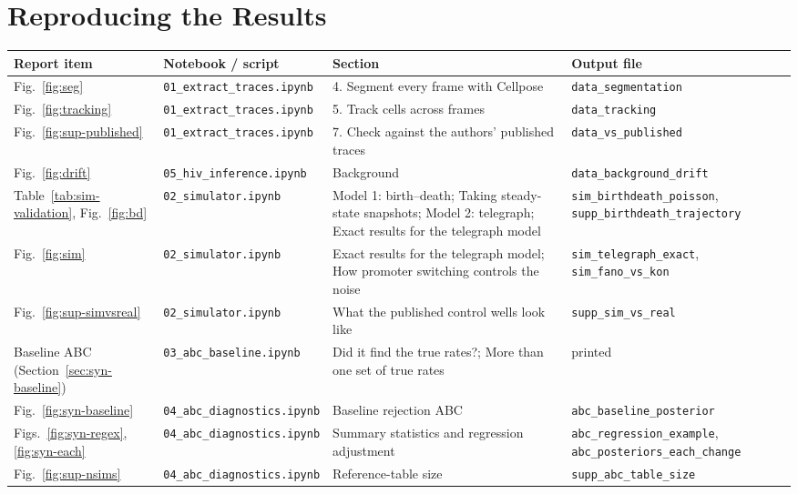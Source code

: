 \chapter{Reproducing the Results}\label{app:reproduce}

\begin{table}[htbp]
\centering
\footnotesize
\begin{tabular}{p{3.0cm}p{4.3cm}p{4.3cm}p{3.7cm}}
\toprule
Report item & Notebook / script & Section & Output file \\
\midrule
Fig.~\ref{fig:seg} & \texttt{01\_extract\_traces.ipynb} & 4. Segment every frame with Cellpose & \texttt{data\_segmentation} \\
Fig.~\ref{fig:tracking} & \texttt{01\_extract\_traces.ipynb} & 5. Track cells across frames & \texttt{data\_tracking} \\
Fig.~\ref{fig:sup-published} & \texttt{01\_extract\_traces.ipynb} & 7. Check against the authors' published traces & \texttt{data\_vs\_published} \\
Fig.~\ref{fig:drift} & \texttt{05\_hiv\_inference.ipynb} & Background & \texttt{data\_background\_drift} \\
\midrule
Table~\ref{tab:sim-validation}, Fig.~\ref{fig:bd} & \texttt{02\_simulator.ipynb} & Model 1: birth--death; Taking steady-state snapshots; Model 2: telegraph; Exact results for the telegraph model & \texttt{sim\_birthdeath\_poisson}, \texttt{supp\_birthdeath\_trajectory} \\
Fig.~\ref{fig:sim} & \texttt{02\_simulator.ipynb} & Exact results for the telegraph model; How promoter switching controls the noise & \texttt{sim\_telegraph\_exact}, \texttt{sim\_fano\_vs\_kon} \\
Fig.~\ref{fig:sup-simvsreal} & \texttt{02\_simulator.ipynb} & What the published control wells look like & \texttt{supp\_sim\_vs\_real} \\
\midrule
Baseline ABC (Section~\ref{sec:syn-baseline}) & \texttt{03\_abc\_baseline.ipynb} & Did it find the true rates?; More than one set of true rates & printed \\
Fig.~\ref{fig:syn-baseline} & \texttt{04\_abc\_diagnostics.ipynb} & Baseline rejection ABC & \texttt{abc\_baseline\_posterior} \\
Figs.~\ref{fig:syn-regex}, \ref{fig:syn-each} & \texttt{04\_abc\_diagnostics.ipynb} & Summary statistics and regression adjustment & \texttt{abc\_regression\_example}, \texttt{abc\_posteriors\_each\_change} \\
Fig.~\ref{fig:sup-nsims} & \texttt{04\_abc\_diagnostics.ipynb} & Reference-table size & \texttt{supp\_abc\_table\_size} \\

\end{tabular}
\end{table}
